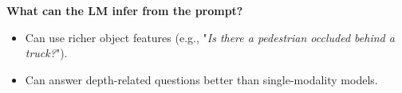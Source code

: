 \documentclass{article} %
\begin{document}
	\noindent \textbf{What can the LM infer from the prompt?}
	\begin{itemize}
		\item Can use richer object features (e.g., "\textit{Is there a pedestrian occluded behind a truck?}").
		\item Can answer depth-related questions better than single-modality models.
	\end{itemize}
	

	
\end{document}

